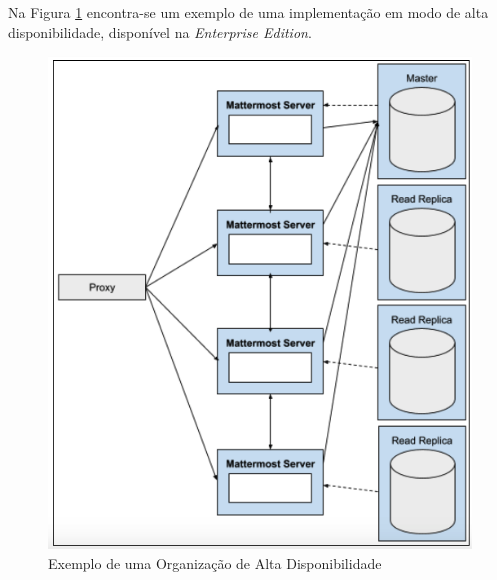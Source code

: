 Na Figura \ref{fig:architecture_high_availability} encontra-se um exemplo de uma implementação em modo de alta disponibilidade, disponível na \textit{Enterprise Edition}.
\par

\begin{figure}[H]
    \centering
    \includegraphics[scale=0.4]{diagramas/architecture_high_availability.png}
    \caption{Exemplo de uma Organização de Alta Disponibilidade \cite{architecture_high_availability}}
    \label{fig:architecture_high_availability}
\end{figure}

